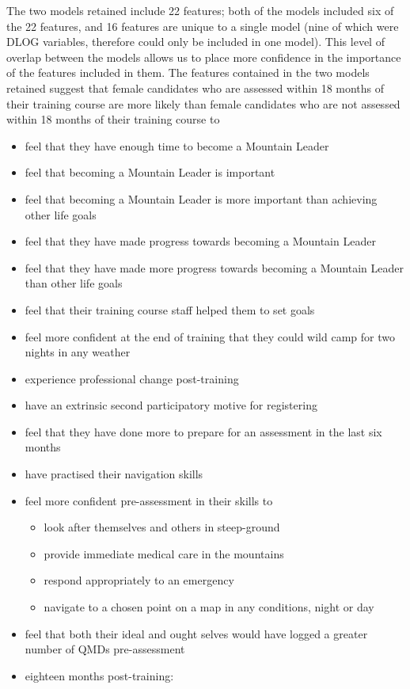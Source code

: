 \documentclass[
  12pt,
  a4paper,
]{book}
\providecommand{\tightlist}{%
  \setlength{\itemsep}{0pt}\setlength{\parskip}{0pt}}
\begin{document}
The two models retained include 22 features; both of the models included six of the 22 features, and 16 features are unique to a single model (nine of which were DLOG variables, therefore could only be included in one model). This level of overlap between the models allows us to place more confidence in the importance of the features included in them. The features contained in the two models retained suggest that female candidates who are assessed within 18 months of their training course are more likely than female candidates who are not assessed within 18 months of their training course to

\begin{itemize}
\tightlist
\item
  feel that they have enough time to become a Mountain Leader
\item
  feel that becoming a Mountain Leader is important
\item
  feel that becoming a Mountain Leader is more important than achieving other life goals
\item
  feel that they have made progress towards becoming a Mountain Leader
\item
  feel that they have made more progress towards becoming a Mountain Leader than other life goals
\item
  feel that their training course staff helped them to set goals
\item
  feel more confident at the end of training that they could wild camp for two nights in any weather
\item
  experience professional change post-training
\item
  have an extrinsic second participatory motive for registering
\item
  feel that they have done more to prepare for an assessment in the last six months
\item
  have practised their navigation skills
\item
  feel more confident pre-assessment in their skills to

  \begin{itemize}
  \tightlist
  \item
    look after themselves and others in steep-ground
  \item
    provide immediate medical care in the mountains
  \item
    respond appropriately to an emergency
  \item
    navigate to a chosen point on a map in any conditions, night or day
  \end{itemize}
\item
  feel that both their ideal and ought selves would have logged a greater number of QMDs pre-assessment
\item
  eighteen months post-training:


\end{itemize}
\end{document}
